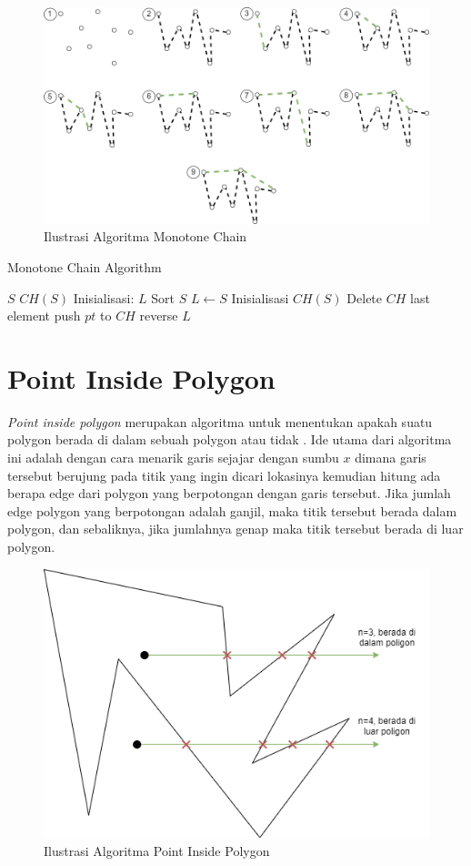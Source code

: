 \begin{figure}[!h]
	\Centering
	\includegraphics [width=\columnwidth]{bab2/img/ilustrasi-algoritma-monotone-chain}
	\caption {Ilustrasi Algoritma Monotone Chain}
	\label {fig:ilustrasi-algoritma-monotone-chain}
\end{figure}

\begin{algorithm}
	\caption{Monotone Chain Algorithm}
	\label{psdo:Monotone-Chain-Algorithm}
	\begin{algorithmic}[1]
		\Require $S$
		\Ensure $CH(S)$
        \State Inisialisasi: $L$
        \State Sort $S$
        \State $L \leftarrow S$
        \State Inisialisasi $CH(S)$
                    \State Delete $CH$ last element
                \EndWhile
                \State push $pt$ to $CH$
            \EndFor
            \State reverse $L$
        \EndFor
	\end{algorithmic}
\end{algorithm}
\section{Point Inside Polygon}
\label{sec:point-inside-polygon}
\textit{Point inside polygon} merupakan algoritma untuk menentukan apakah suatu polygon berada di dalam sebuah polygon atau tidak \cite{point_inside_polygon}. Ide utama dari algoritma ini adalah dengan cara menarik garis sejajar dengan sumbu $x$ dimana garis tersebut berujung pada titik yang ingin dicari lokasinya kemudian hitung ada berapa edge dari polygon yang berpotongan dengan garis tersebut. Jika jumlah edge polygon yang berpotongan adalah ganjil, maka titik tersebut berada dalam polygon, dan sebaliknya, jika jumlahnya genap maka titik tersebut berada di luar polygon.

\begin{figure}[!h]
	\Centering
	\includegraphics [width=0.5\columnwidth]{bab2/img/ilustrasi-algoritma-point-inside-polygon}
	\caption {Ilustrasi Algoritma Point Inside Polygon}
	\label {fig:ilustrasi-algoritma-point-inside-polygon}
\end{figure}
